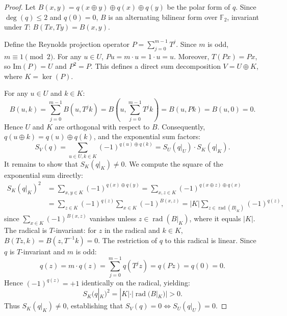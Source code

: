 \documentclass[11pt,a4paper]{article}
\theoremstyle{definition}
\newcommand{\F}{\mathbb{F}_2}
\DeclareMathOperator{\rad}{rad}
\begin{document}
\begin{proof}
Let $B(x, y) = q(x \oplus y) \oplus q(x) \oplus q(y)$ be the polar form of $q$. Since $\deg(q) \le 2$ and $q(0) = 0$, $B$ is an alternating bilinear form over $\F$, invariant under $T$: $B(Tx, Ty) = B(x, y)$.

Define the Reynolds projection operator $P = \sum_{j=0}^{m-1} T^j$. Since $m$ is odd, $m \equiv 1 \pmod 2$. For any $u \in U$, $Pu = m \cdot u = 1 \cdot u = u$. Moreover, $T(Px) = Px$, so $\mathrm{Im}(P) = U$ and $P^2 = P$. This defines a direct sum decomposition $V = U \oplus K$, where $K = \ker(P)$.

For any $u \in U$ and $k \in K$:
\begin{equation}
B(u, k) = \sum_{j=0}^{m-1} B(u, T^j k) = B\left(u, \sum_{j=0}^{m-1} T^j k\right) = B(u, Pk) = B(u, 0) = 0.
\end{equation}
Hence $U$ and $K$ are orthogonal with respect to $B$. Consequently, $q(u \oplus k) = q(u) \oplus q(k)$, and the exponential sum factors:
\begin{equation}
S_V(q) = \sum_{u \in U, k \in K} (-1)^{q(u) \oplus q(k)} = S_U(q|_U) \cdot S_K(q|_K).
\end{equation}
It remains to show that $S_K(q|_K) \ne 0$. We compute the square of the exponential sum directly:
\begin{align}
S_K(q|_K)^2 &= \sum_{x, y \in K} (-1)^{q(x) \oplus q(y)} = \sum_{x, z \in K} (-1)^{q(x \oplus z) \oplus q(x)} \nonumber \\
&= \sum_{z \in K} (-1)^{q(z)} \sum_{x \in K} (-1)^{B(x, z)} = |K| \sum_{z \in \rad(B|_K)} (-1)^{q(z)},
\end{align}
since $\sum_{x \in K} (-1)^{B(x, z)}$ vanishes unless $z \in \rad(B|_K)$, where it equals $|K|$. The radical is $T$-invariant: for $z$ in the radical and $k\in K$, $B(Tz,k)=B(z,T^{-1}k)=0$. The restriction of $q$ to this radical is linear. Since $q$ is $T$-invariant and $m$ is odd:
\begin{equation}
q(z) = m \cdot q(z) = \sum_{j=0}^{m-1} q(T^j z) = q(Pz) = q(0) = 0.
\end{equation}
Hence $(-1)^{q(z)} = +1$ identically on the radical, yielding:
\begin{equation}
S_K(q|_K)^2 = |K| \cdot |\rad(B|_K)| > 0.
\end{equation}
Thus $S_K(q|_K) \ne 0$, establishing that $S_V(q) = 0 \iff S_U(q|_U) = 0$.
\end{proof}

\end{document}
